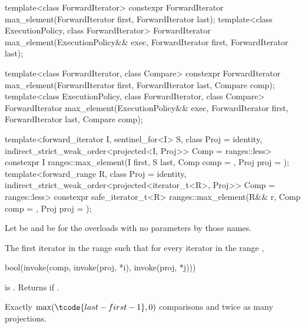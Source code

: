 %
\begin{itemdecl}
template<class ForwardIterator>
  constexpr ForwardIterator max_element(ForwardIterator first, ForwardIterator last);
template<class ExecutionPolicy, class ForwardIterator>
  ForwardIterator max_element(ExecutionPolicy&& exec,
                              ForwardIterator first, ForwardIterator last);

template<class ForwardIterator, class Compare>
  constexpr ForwardIterator max_element(ForwardIterator first, ForwardIterator last,
                                        Compare comp);
template<class ExecutionPolicy, class ForwardIterator, class Compare>
  ForwardIterator max_element(ExecutionPolicy&& exec,
                              ForwardIterator first, ForwardIterator last,
                              Compare comp);

template<forward_iterator I, sentinel_for<I> S, class Proj = identity,
         indirect_strict_weak_order<projected<I, Proj>> Comp = ranges::less>
  constexpr I ranges::max_element(I first, S last, Comp comp = {}, Proj proj = {});
template<forward_range R, class Proj = identity,
         indirect_strict_weak_order<projected<iterator_t<R>, Proj>> Comp = ranges::less>
  constexpr safe_iterator_t<R>
    ranges::max_element(R&& r, Comp comp = {}, Proj proj = {});
\end{itemdecl}

\begin{itemdescr}
\pnum
Let  be 
and  be 
for the overloads with no parameters by those names.

\pnum
\returns
The first iterator  in the range 
such that for every iterator  in the range ,
\begin{codeblock}
bool(invoke(comp, invoke(proj, *i), invoke(proj, *j)))
\end{codeblock}
is .
Returns  if .

\pnum
\complexity
Exactly $\max(\tcode{last - first - 1}, 0)$ comparisons and
twice as many projections.
\end{itemdescr}

